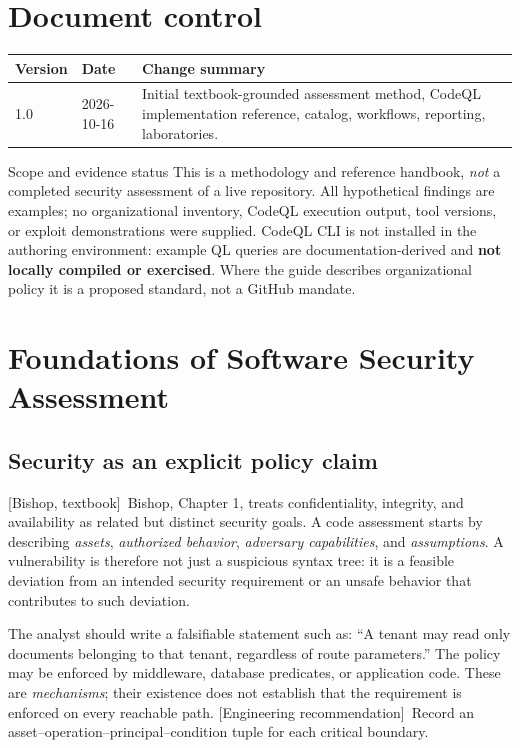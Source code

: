 \documentclass[11pt,letterpaper,oneside]{book}
\newcommand{\srcB}{\textsf{[Bishop, textbook]}}
\newcommand{\srcR}{\textsf{[Engineering recommendation]}}
\begin{document}
\chapter*{Document control}
\begin{tabularx}{\linewidth}{l l X}
\toprule Version & Date & Change summary \\\midrule
1.0 & 2026-10-16 & Initial textbook-grounded assessment method, CodeQL implementation reference, catalog, workflows, reporting, laboratories.\\\bottomrule
\end{tabularx}
\vspace{10pt}
\begin{infobox}{Scope and evidence status}
This is a methodology and reference handbook, \emph{not} a completed security assessment of a live repository. All hypothetical findings are examples; no organizational inventory, CodeQL execution output, tool versions, or exploit demonstrations were supplied. CodeQL CLI is not installed in the authoring environment: example QL queries are documentation-derived and \textbf{not locally compiled or exercised}. Where the guide describes organizational policy it is a proposed standard, not a GitHub mandate.
\end{infobox}
\tableofcontents
\listoffigures
\listoftables
\lstlistoflistings
\mainmatter
\chapter{Foundations of Software Security Assessment}

\section{Security as an explicit policy claim}

\srcB\ Bishop, Chapter 1, treats confidentiality, integrity, and availability as related but distinct security goals. A code assessment starts by describing \emph{assets}, \emph{authorized behavior}, \emph{adversary capabilities}, and \emph{assumptions}. A vulnerability is therefore not just a suspicious syntax tree: it is a feasible deviation from an intended security requirement or an unsafe behavior that contributes to such deviation.

The analyst should write a falsifiable statement such as: ``A tenant may read only documents belonging to that tenant, regardless of route parameters.'' The policy may be enforced by middleware, database predicates, or application code. These are \emph{mechanisms}; their existence does not establish that the requirement is enforced on every reachable path. \srcR\ Record an asset--operation--principal--condition tuple for each critical boundary.
\end{document}
